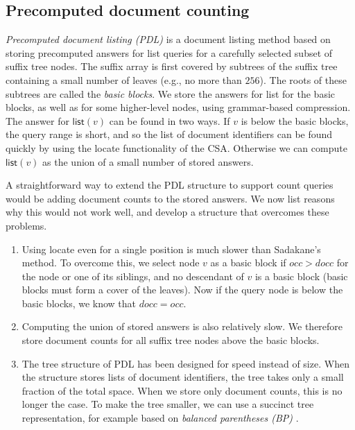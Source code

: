\documentclass[11pt]{llncs}
\newcommand{\locate}{\textsf{locate}}
\newcommand{\doccount}{\textsf{count}}
\newcommand{\doclist}{\textsf{list}}
\newcommand{\mlist}{\ensuremath{\mathsf{list}}}
\begin{document}
\subsection{Precomputed document counting}

\emph{Precomputed document listing (PDL)} \cite{GKNPS13} is a document listing method based on storing precomputed answers for \doclist{} queries for a carefully selected subset of suffix tree nodes. The suffix array is first covered by subtrees of the suffix tree containing a small number of leaves (e.g., no more than $256$). The roots of these subtrees are called the \emph{basic blocks}. We store the answers for \doclist{} for the basic blocks, as well as for some higher-level nodes, using grammar-based compression. The answer for $\mlist(v)$ can be found in two ways. If $v$ is below the basic blocks, the query range is short, and so the list of document identifiers can be found quickly by using the \locate{} functionality of the CSA. Otherwise we can compute $\mlist(v)$ as the union of a small number of stored answers.

A straightforward way to extend the PDL structure to support \doccount{} queries would be adding document counts to the stored answers. We now list reasons why this would not work well, and develop a structure that overcomes these problems.

\begin{enumerate}

\item Using \locate{} even for a single position is much slower than
Sadakane's method. To overcome this, we select node $v$ as a basic block if
$occ > docc$ for the node or one of its siblings, and no descendant of $v$ is
a basic block (basic blocks must form a cover of the leaves). Now if the query node is below the basic blocks, we know that $docc = occ$.

\item Computing the union of stored answers is also relatively slow. We therefore store document counts for all suffix tree nodes above the basic blocks.

\item The tree structure of PDL has been designed for speed instead of size.
When the structure stores lists of document identifiers, the tree takes only a
small fraction of the total space. When we store only document counts, this is
no longer the case. To make the tree smaller, we can use a succinct tree
representation, for example based on \emph{balanced
parentheses (BP)} \cite{MR02}.

\end{enumerate}
\end{document}
